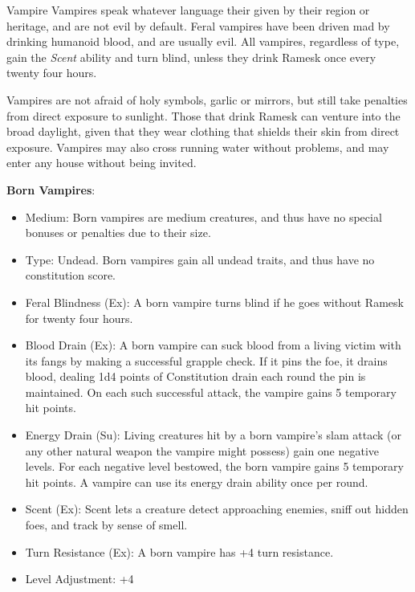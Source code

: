 \begin{35e}{Vampire}
  Vampires speak whatever language their given by their region or heritage,
  and are not evil by default. Feral vampires have been driven mad by drinking
  humanoid blood, and are usually evil. All vampires, regardless of type, gain
  the \emph{Scent} ability and turn blind, unless they drink Ramesk once every
  twenty four hours.

  Vampires are not afraid of holy symbols, garlic or mirrors, but still take
  penalties from direct exposure to sunlight. Those that drink Ramesk can
  venture into the broad daylight, given that they wear clothing that shields
  their skin from direct exposure. Vampires may also cross running water
  without problems, and may enter any house without being invited.

  \textbf{Born Vampires}:\\
  \begin{itemize}[noitemsep]
    \item Medium: Born vampires are medium creatures, and thus have no special
      bonuses or penalties due to their size.
    \item Type: Undead. Born vampires gain all undead traits, and thus have no
      constitution score.
    \item Feral Blindness (Ex): A born vampire turns blind if he goes without
      Ramesk for twenty four hours.
    \item Blood Drain (Ex): A born vampire can suck blood from a living victim
      with its fangs by making a successful grapple check. If it pins the foe,
      it drains blood, dealing 1d4 points of Constitution drain each round the
      pin is maintained. On each such successful attack, the vampire gains 5
      temporary hit points.
    \item Energy Drain (Su): Living creatures hit by a born vampire's slam
      attack (or any other natural weapon the vampire might possess) gain one
      negative levels. For each negative level bestowed, the born vampire
      gains 5 temporary hit points. A vampire can use its energy drain ability
      once per round.
    \item Scent (Ex): Scent lets a creature detect approaching enemies, sniff
      out hidden foes, and track by sense of smell.
    \item Turn Resistance (Ex): A born vampire has +4 turn resistance.
    \item Level Adjustment: +4
  \end{itemize}
\end{35e}

